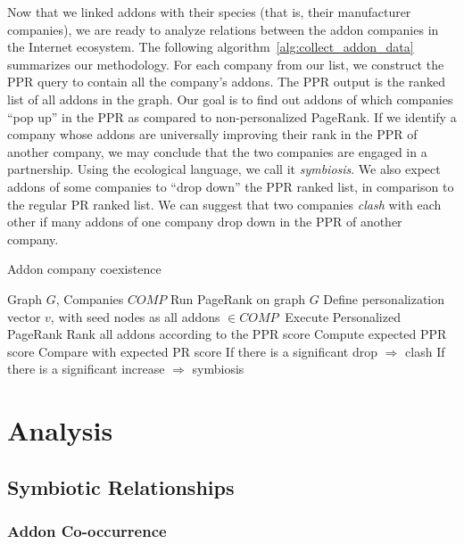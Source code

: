\documentclass[11pt,oneside]{book}
\let\Oldsection\section
\renewcommand{\section}{\FloatBarrier\Oldsection}
\let\Oldsubsection\subsection
\renewcommand{\subsection}{\FloatBarrier\Oldsubsection}
\let\Oldsubsubsection\subsubsection
\renewcommand{\subsubsection}{\FloatBarrier\Oldsubsubsection}
\begin{document}
Now that we linked addons with their species (that is, their manufacturer companies), we are ready to analyze relations between the addon companies in the Internet ecosystem. The following algorithm~\autoref{alg:collect_addon_data} summarizes our methodology. 
For each company from our list, we construct the PPR query to contain all the company's addons. The PPR output is the ranked list of all addons in the graph. Our goal is to find out addons of which companies ``pop up'' in the PPR as compared to non-personalized PageRank. If we identify a company whose addons are universally improving their rank in the PPR of another company, we may conclude that the two companies are engaged in a partnership. Using the ecological language, we call it \emph{symbiosis}. We also expect addons of some companies to ``drop down'' the PPR ranked list, in comparison to the regular PR ranked list. We can suggest that two companies \emph{clash} with each other if many addons of one company drop down in the PPR of another company.

\begin{algorithm}[!t]
\caption{Addon company coexistence}
\label{alg:collect_addon_data}
\begin{algorithmic}[1] 
\REQUIRE Graph $G$, Companies $COMP$
\STATE Run PageRank on graph $G$
\STATE Define personalization vector $v$, with seed nodes as all addons $\in COMP\ $
\STATE Execute Personalized PageRank
\STATE Rank all addons according to the PPR score
\STATE Compute expected PPR score 
\STATE Compare with expected PR score
\STATE If there is a significant drop $\Rightarrow$ clash
\STATE If there is a significant increase $\Rightarrow$ symbiosis
\ENDFOR
\ENDFOR
\end{algorithmic}
\end{algorithm}

\section{Analysis}
\subsection{Symbiotic Relationships}
\label{sec:symb_relations}

\subsubsection{Addon Co-occurrence}
\label{subsub:co_occurrence}
\end{document}
